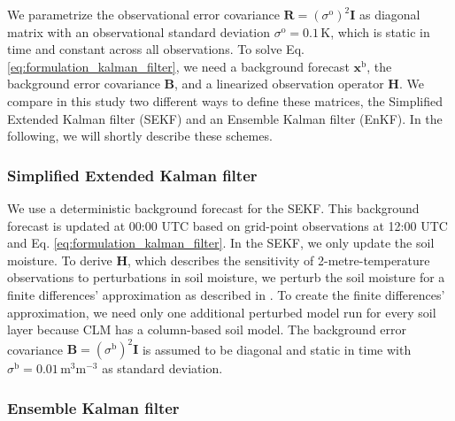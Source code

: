 \documentclass[HESSD, manuscript]{copernicus}
\begin{document}
We parametrize the observational error covariance $\mathbf{R} = (\sigma^\text{o})^2 \mathbf{I}$ as diagonal matrix with an observational standard deviation $\sigma^\text{o} = 0.1\,\text{K}$, which is static in time and constant across all observations.
To solve Eq. \eqref{eq:formulation_kalman_filter}, we need a background forecast $\mathbf{x}^\text{b}$, the background error covariance $\mathbf{B}$, and a linearized observation operator $\mathbf{H}$.
We compare in this study two different ways to define these matrices, the Simplified Extended Kalman filter (SEKF) and an Ensemble Kalman filter (EnKF).
In the following, we will shortly describe these schemes.

\subsubsection{Simplified Extended Kalman filter}

We use a deterministic background forecast for the SEKF.
This background forecast is updated at 00:00 UTC based on grid-point observations at 12:00 UTC and Eq. \eqref{eq:formulation_kalman_filter}.
In the SEKF, we only update the soil moisture.
To derive $\mathbf{H}$, which describes the sensitivity of 2-metre-temperature observations to perturbations in soil moisture, we perturb the soil moisture for a finite differences' approximation as described in \citet{hess_assimilation_2001,rosnay_simplified_2013}.
To create the finite differences' approximation, we need only one additional perturbed model run for every soil layer because CLM has a column-based soil model.
The background error covariance $\mathbf{B} = (\sigma^\text{b})^2 \mathbf{I}$ is assumed to be diagonal and static in time with $\sigma^\text{b} = 0.01\,\text{m}^3 \text{m}^{-3}$ as standard deviation.

\subsubsection{Ensemble Kalman filter}
\end{document}
